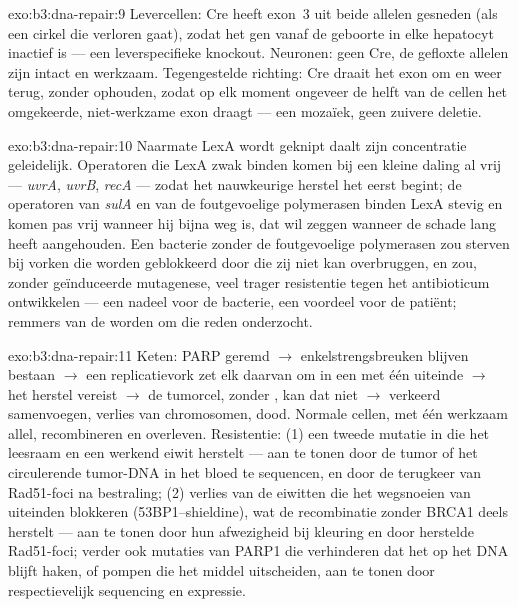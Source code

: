 \begin{solution}{exo:b3:dna-repair:9}
Levercellen: Cre heeft exon~3 uit beide allelen gesneden (als een
cirkel die verloren gaat), zodat het gen vanaf de geboorte in elke
hepatocyt inactief is --- een leverspecifieke knockout. Neuronen: geen
Cre, de gefloxte allelen zijn intact en werkzaam. Tegengestelde
richting: Cre draait het exon om en weer terug, zonder ophouden, zodat
op elk moment ongeveer de helft van de cellen het omgekeerde,
niet-werkzame exon draagt --- een mozaïek, geen zuivere deletie.
\end{solution}

\begin{solution}{exo:b3:dna-repair:10}
Naarmate LexA wordt geknipt daalt zijn concentratie geleidelijk.
Operatoren die LexA zwak binden komen bij een kleine daling al vrij ---
\emph{uvrA}, \emph{uvrB}, \emph{recA} --- zodat het nauwkeurige herstel
het eerst begint; de operatoren van \emph{sulA} en van de
foutgevoelige polymerasen binden LexA stevig en komen pas vrij wanneer
hij bijna weg is, dat wil zeggen wanneer de schade lang heeft
aangehouden. Een bacterie zonder de foutgevoelige polymerasen zou
sterven bij vorken die worden geblokkeerd door  die zij niet kan
overbruggen, en zou, zonder geïnduceerde mutagenese, veel trager
resistentie tegen het antibioticum ontwikkelen --- een nadeel voor de
bacterie, een voordeel voor de patiënt; remmers van de 
worden om die reden onderzocht.
\end{solution}

\begin{solution}{exo:b3:dna-repair:11}
Keten: PARP geremd $\to$ enkelstrengsbreuken blijven bestaan $\to$ een
replicatievork zet elk daarvan om in een  met één
uiteinde $\to$ het herstel vereist  $\to$ de
tumorcel, zonder , kan dat niet $\to$ verkeerd samenvoegen, verlies
van chromosomen, dood. Normale cellen, met één werkzaam allel,
recombineren en overleven. Resistentie: (1) een tweede mutatie in
\emph{} die het leesraam en een werkend eiwit herstelt --- aan te
tonen door de tumor of het circulerende tumor-DNA in het bloed te
sequencen, en door de terugkeer van Rad51-foci na bestraling; (2)
verlies van de eiwitten die het wegsnoeien van uiteinden blokkeren
(53BP1--shieldine), wat de recombinatie zonder BRCA1 deels herstelt ---
aan te tonen door hun afwezigheid bij kleuring en door herstelde
Rad51-foci; verder ook mutaties van PARP1 die verhinderen dat het op
het DNA blijft haken, of pompen die het middel uitscheiden, aan te
tonen door respectievelijk sequencing en expressie.
\end{solution}

